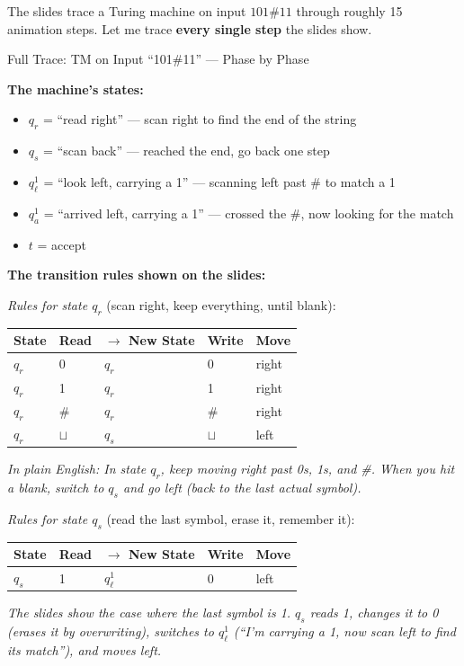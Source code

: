 \documentclass[11pt,a4paper]{article}
\begin{document}
The slides trace a Turing machine on input $101\#11$ through roughly 15 animation steps. Let me trace \textbf{every single step} the slides show.

\begin{examplebox}{Full Trace: TM on Input ``101\#11'' --- Phase by Phase}

\textbf{The machine's states:}
\begin{itemize}[nosep]
\item $q_r$ = ``read right'' --- scan right to find the end of the string
\item $q_s$ = ``scan back'' --- reached the end, go back one step
\item $q_\ell^1$ = ``look left, carrying a 1'' --- scanning left past \# to match a 1
\item $q_a^1$ = ``arrived left, carrying a 1'' --- crossed the \#, now looking for the match
\item $t$ = accept
\end{itemize}

\textbf{The transition rules shown on the slides:}

\textit{Rules for state $q_r$} (scan right, keep everything, until blank):
\begin{center}
\begin{tabular}{lllll}
\toprule
State & Read & $\to$ New State & Write & Move \\
\midrule
$q_r$ & 0 & $q_r$ & 0 & right \\
$q_r$ & 1 & $q_r$ & 1 & right \\
$q_r$ & \# & $q_r$ & \# & right \\
$q_r$ & $\sqcup$ & $q_s$ & $\sqcup$ & left \\
\bottomrule
\end{tabular}
\end{center}
\textit{In plain English: In state $q_r$, keep moving right past 0s, 1s, and \#. When you hit a blank, switch to $q_s$ and go left (back to the last actual symbol).}

\textit{Rules for state $q_s$} (read the last symbol, erase it, remember it):
\begin{center}
\begin{tabular}{lllll}
\toprule
State & Read & $\to$ New State & Write & Move \\
\midrule
$q_s$ & 1 & $q_\ell^1$ & 0 & left \\
\bottomrule
\end{tabular}
\end{center}
\textit{The slides show the case where the last symbol is 1. $q_s$ reads 1, changes it to 0 (erases it by overwriting), switches to $q_\ell^1$ (``I'm carrying a 1, now scan left to find its match''), and moves left.}


\end{examplebox}
\end{document}
